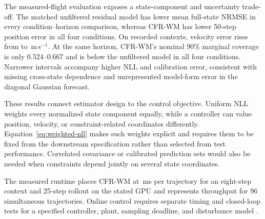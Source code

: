 The measured-flight evaluation exposes a state-component and uncertainty
trade-off. The matched unfiltered residual model has lower mean full-state
NRMSE in every condition--horizon comparison, whereas CFR-WM has lower 50-step
position error in all four conditions. On recorded contexts, velocity error
rises from \ExternalUnfilteredRecordedLongVelocityMean{} to
\ExternalCFRRecordedLongVelocityMean{}\,m\,s$^{-1}$. At the same horizon,
CFR-WM's nominal 90\% marginal coverage is only 0.524--0.667 and is below the
unfiltered model in all four conditions. Narrower intervals accompany higher
NLL and calibration error, consistent with missing cross-state dependence and
unrepresented model-form error in the diagonal Gaussian forecast.

These results connect estimator design to the control objective. Uniform NLL
weights every normalized state component equally, while a controller can value
position, velocity, or constraint-related coordinates differently.
Equation~\eqref{eq:weighted-nll} makes such weights explicit and requires them
to be fixed from the downstream specification rather than selected from test
performance. Correlated covariance or calibrated prediction sets would also be
needed when constraints depend jointly on several state coordinates.

The measured runtime places CFR-WM at
\CFRLatencyMean{}\,ms per trajectory for an eight-step context and 25-step
rollout on the stated GPU and represents throughput for 96 simultaneous
trajectories. Online control requires separate timing and closed-loop tests for
a specified controller, plant, sampling deadline, and disturbance model
\cite{hewing2020_learning_mpc}.
